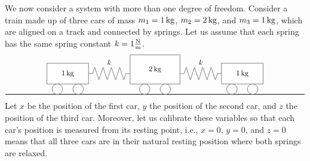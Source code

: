 We now consider a system with more than one degree of
freedom. Consider a train made up of three cars of mass $m_1=1\mathop{\textrm{\rm kg}}\nolimits$,
$m_2=2\mathop{\textrm{\rm kg}}\nolimits$, and $m_3=1\mathop{\textrm{\rm kg}}\nolimits$, which are aligned on a track and connected by
springs. Let us assume that each spring has the same spring constant
$k=1\frac{\mathop{\textrm{\rm N}}\nolimits}{\mathop{\textrm{\rm m}}\nolimits}$.
\begin{equation*}
    \begin{tikzpicture}
      \draw[thick] (0,0) -- (14.4,0);
      \begin{scope}
        \draw[fill=white] (2,0.5) rectangle node {$1\kg$} (4,1.5);
        \draw[fill=white] (2.5,0.25) circle (0.25);
        \draw[fill=white] (3.5,0.25) circle (0.25);
      \end{scope}
      \begin{scope}[xshift=4.2cm]
        \draw[fill=white] (1.8,0.5) rectangle node {$2\kg$} (4.2,1.9);
        \draw[fill=white] (2.5,0.25) circle (0.25);
        \draw[fill=white] (3.5,0.25) circle (0.25);
      \end{scope}
      \begin{scope}[xshift=8.4cm]
        \draw[fill=white] (2,0.5) rectangle node {$1\kg$} (4,1.5);
        \draw[fill=white] (2.5,0.25) circle (0.25);
        \draw[fill=white] (3.5,0.25) circle (0.25);
      \end{scope}
      \begin{scope}[xshift=4cm]
        \draw (0,1) -- (0.2,1) -- ++(0.1,0.3)
        -- ++(0.2,-0.6) -- ++(0.2,0.6)
        -- ++(0.2,-0.6) -- ++(0.2,0.6)
        -- ++(0.2,-0.6) -- ++(0.2,0.6)
        -- ++(0.2,-0.6) -- ++(0.1,0.3)
        -- (2,1);
        \draw (1,1.3) node[above] {$k$};
      \end{scope}
      \begin{scope}[xshift=8.4cm]
        \draw (0,1) -- (0.2,1) -- ++(0.1,0.3)
        -- ++(0.2,-0.6) -- ++(0.2,0.6)
        -- ++(0.2,-0.6) -- ++(0.2,0.6)
        -- ++(0.2,-0.6) -- ++(0.2,0.6)
        -- ++(0.2,-0.6) -- ++(0.1,0.3)
        -- (2,1);
        \draw (1,1.3) node[above] {$k$};
      \end{scope}
    \end{tikzpicture}
\end{equation*}
Let $x$ be the position of the first car, $y$ the position of the
second car, and $z$ the position of the third car. Moreover, let us
calibrate these variables so that each car's position is measured from
its resting point, i.e., $x=0$, $y=0$, and $z=0$ means that all three
cars are in their natural resting position where both springs are
relaxed.

